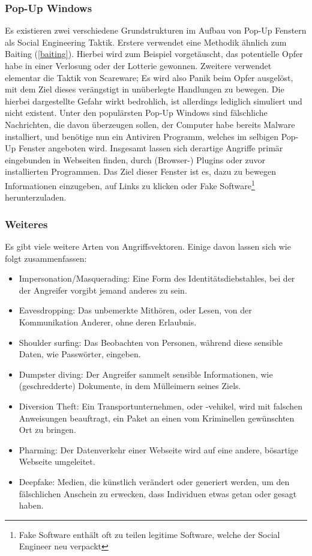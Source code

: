 \subsubsection{Pop-Up Windows}
Es existieren zwei verschiedene Grundstrukturen im Aufbau von Pop-Up Fenstern als Social Engineering Taktik. Erstere verwendet eine Methodik ähnlich zum Baiting (\autoref{baiting}).
Hierbei wird zum Beispiel vorgetäuscht, das potentielle Opfer habe in einer Verlosung oder der Lotterie gewonnen.
Zweitere verwendet elementar die Taktik von Scareware; Es wird also Panik beim Opfer ausgelöst, mit dem Ziel dieses verängstigt in unüberlegte Handlungen zu bewegen. Die hierbei
dargestellte Gefahr wirkt bedrohlich, ist allerdings lediglich simuliert und nicht existent. Unter den populärsten Pop-Up Windows sind fälschliche Nachrichten, die davon
überzeugen sollen, der Computer habe bereits Malware installiert, und benötige nun ein Antiviren Programm, welches im selbigen Pop-Up Fenster angeboten wird.
Insgesamt lassen sich derartige Angriffe primär eingebunden in Webseiten finden, durch (Browser-) Plugins oder
zuvor installierten Programmen. Das Ziel dieser Fenster ist es, dazu zu bewegen Informationen einzugeben, auf Links zu klicken oder Fake Software\footnote{Fake Software enthält oft zu teilen legitime Software, welche der Social Engineer neu verpackt} herunterzuladen.

\subsubsection{Weiteres}
Es gibt viele weitere Arten von Angriffsvektoren. Einige davon lassen sich wie folgt zusammenfassen:

\begin{itemize}
    \setlength\itemsep{-1em}
    \item Impersonation/Masquerading: Eine Form des Identitätsdiebstahles, bei der der Angreifer vorgibt jemand anderes zu sein.
    \item Eavesdropping: Das unbemerkte Mithören, oder Lesen, von der Kommunikation Anderer, ohne deren Erlaubnis.
    \item Shoulder surfing: Das Beobachten von Personen, während diese sensible Daten, wie Passwörter, eingeben.
    \item Dumpster diving: Der Angreifer sammelt sensible Informationen, wie (geschredderte) Dokumente, in dem Mülleimern seines Ziels.
    \item Diversion Theft: Ein Transportunternehmen, oder -vehikel, wird mit falschen Anweisungen beauftragt, ein Paket an einen vom Kriminellen gewünschten Ort zu bringen.
    \item Pharming: Der Datenverkehr einer Webseite wird auf eine andere, bösartige Webseite umgeleitet.
    \item Deepfake: Medien, die künstlich verändert oder generiert werden, um den fälschlichen Anschein zu erwecken, dass Individuen etwas getan oder gesagt haben.
\end{itemize}

